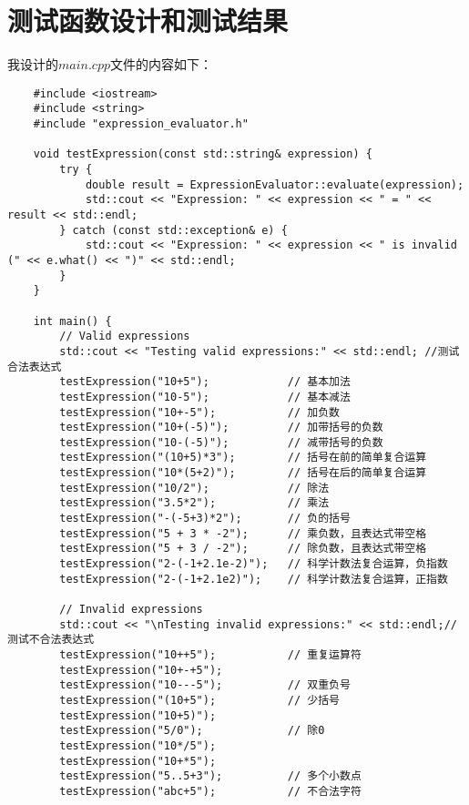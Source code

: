 \documentclass[UTF8]{ctexart}
\begin{document}
\section{测试函数设计和测试结果}
我设计的$main.cpp$文件的内容如下：
\begin{lstlisting}
    #include <iostream>
    #include <string>
    #include "expression_evaluator.h"
    
    void testExpression(const std::string& expression) {
        try {
            double result = ExpressionEvaluator::evaluate(expression);
            std::cout << "Expression: " << expression << " = " << result << std::endl;
        } catch (const std::exception& e) {
            std::cout << "Expression: " << expression << " is invalid (" << e.what() << ")" << std::endl;
        }
    }
    
    int main() {
        // Valid expressions
        std::cout << "Testing valid expressions:" << std::endl; //测试合法表达式
        testExpression("10+5");            // 基本加法
        testExpression("10-5");            // 基本减法
        testExpression("10+-5");           // 加负数
        testExpression("10+(-5)");         // 加带括号的负数
        testExpression("10-(-5)");         // 减带括号的负数
        testExpression("(10+5)*3");        // 括号在前的简单复合运算
        testExpression("10*(5+2)");        // 括号在后的简单复合运算
        testExpression("10/2");            // 除法
        testExpression("3.5*2");           // 乘法
        testExpression("-(-5+3)*2");       // 负的括号
        testExpression("5 + 3 * -2");      // 乘负数，且表达式带空格
        testExpression("5 + 3 / -2");      // 除负数，且表达式带空格
        testExpression("2-(-1+2.1e-2)");   // 科学计数法复合运算，负指数
        testExpression("2-(-1+2.1e2)");    // 科学计数法复合运算，正指数
    
        // Invalid expressions
        std::cout << "\nTesting invalid expressions:" << std::endl;//测试不合法表达式
        testExpression("10++5");           // 重复运算符
        testExpression("10+-+5");          
        testExpression("10---5");          // 双重负号
        testExpression("(10+5");           // 少括号
        testExpression("10+5)");           
        testExpression("5/0");             // 除0
        testExpression("10*/5");           
        testExpression("10+*5");           
        testExpression("5..5+3");          // 多个小数点
        testExpression("abc+5");           // 不合法字符
    

\end{lstlisting}
\end{document}
